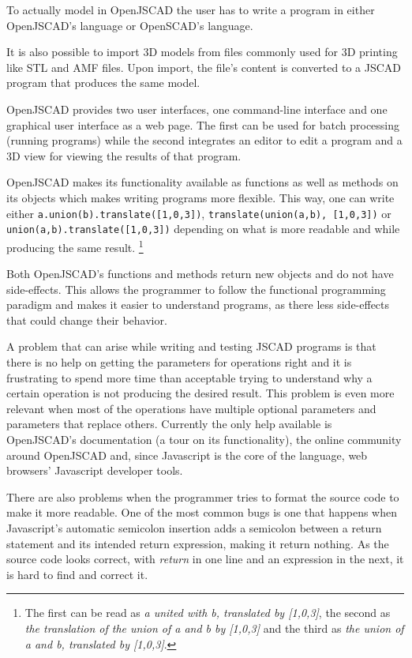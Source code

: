 \documentclass{./llncs2e/llncs}
\begin{document}
	To actually model in OpenJSCAD the user has to write a program in either OpenJSCAD's language or OpenSCAD's language.

	It is also possible to import 3D models from files commonly used for 3D printing like STL and AMF files.
	Upon import, the file's content is converted to a JSCAD program that produces the same model. 

	OpenJSCAD provides two user interfaces, one command-line interface and one graphical user interface as a web page.
	The first can be used for batch processing (running programs) while the second integrates an editor to edit a program and a 3D view for viewing the results of that program.

	OpenJSCAD makes its functionality available as functions as well as methods on its objects which makes writing programs more flexible.
	This way, one can write either \lstinline|a.union(b).translate([1,0,3])|, \lstinline|translate(union(a,b), [1,0,3])| or \lstinline|union(a,b).translate([1,0,3])| depending on what is more readable and while producing the same result.
	\footnote{The first can be read as \emph{a united with b, translated by [1,0,3]}, the second as \emph{the translation of the union of a and b by [1,0,3]} and the third as \emph{the union of a and b, translated by [1,0,3]}.}
	
	Both OpenJSCAD's functions and methods return new objects and do not have side-effects. 
	This allows the programmer to follow the functional programming paradigm and makes it easier to understand programs, as there less side-effects that could change their behavior.

	A problem that can arise while writing and testing JSCAD programs is that there is no help on getting the parameters for operations right and it is frustrating to spend more time than acceptable trying to understand why a certain operation is not producing the desired result. 
	This problem is even more relevant when most of the operations have multiple optional parameters and parameters that replace others. 
	Currently the only help available is OpenJSCAD's documentation (a tour on its functionality), the online community around OpenJSCAD and, since Javascript is the core of the language, web browsers' Javascript developer tools.

	There are also problems when the programmer tries to format the source code to make it more readable.
	One of the most common bugs is one that happens when Javascript's automatic semicolon insertion adds a semicolon between a return statement and its intended return expression, making it return nothing.
	As the source code looks correct, with \emph{return} in one line and an expression in the next, it is hard to find and correct it.
\end{document}
